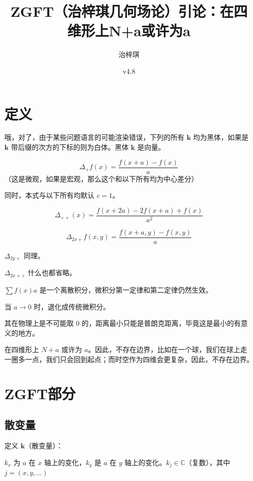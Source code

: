 \documentclass[UTF8]{ctexart}
\title{\textbf{ZGFT（治梓琪几何场论）引论：在四维形上N+a或许为a}}
\author{治梓琪}
\date{v4.8}
\begin{document}
\maketitle

\section{定义}

哦，对了，由于某些问题语言的可能渲染错误，下列的所有 \(\mathbf{k}\) 均为黑体，如果是 \(\mathbf{k}\) 带后缀的次方的下标的则为白体。黑体 \(\mathbf{k}\) 是向量。

\begin{equation}
\Delta_+ f(x)=\frac{f(x+a)-f(x)}{a}
\end{equation}
（这是微观，如果是宏观，那么这个和以下所有均为中心差分）

同时，本式与以下所有均默认 \(c=1\)。

\begin{equation}
\Delta_{++}(x)=\frac{f(x+2a)-2f(x+a)+f(x)}{a^2}
\end{equation}

\begin{equation}
\Delta_{2x+}f(x,y)=\frac{f(x+a,y)-f(x,y)}{a}
\end{equation}

\(\Delta_{2y+}\) 同理。

\(\Delta_{2x++}\) 什么也都省略。

\(\sum f(x)a\) 是一个离散积分，微积分第一定律和第二定律仍然生效。

当 \(a\to 0\) 时，退化成传统微积分。

其在物理上是不可能取 0 的，距离最小只能是普朗克距离，毕竟这是最小的有意义的地方。

在四维形上 \(N+a\) 或许为 \(a\)。因此，不存在边界，比如在一个球，我们在球上走一圈多一点，我们只会回到起点；而时空作为四维会更复杂，因此，不存在边界。

\section{ZGFT部分}

\subsection{散变量}

定义 \(\mathbf{k}\)（散变量）：

\(k_x\) 为 \(a\) 在 \(x\) 轴上的变化，\(k_y\) 是 \(a\) 在 \(y\) 轴上的变化。\(k_j\in\mathbb{C}\)（复数），其中 \(j=(x,y,\dots)\)
\end{document}
